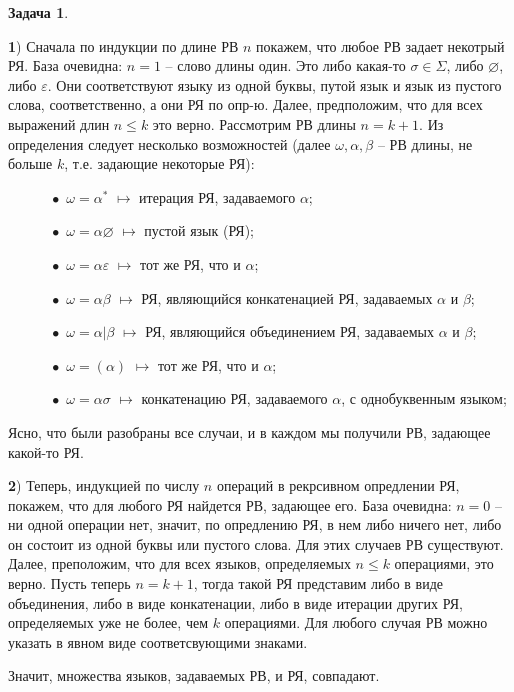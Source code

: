 \documentclass[12pt]{article}
\theoremstyle{definition}
\newtheorem{task}{Задача}
\begin{document}
\begin{task}
\textit{}

\textbf{1}) Сначала по индукции по длине РВ $n$ покажем, что любое РВ задает некотрый РЯ. База очевидна: $n = 1$ -- слово длины один. Это либо какая-то $\sigma \in \Sigma$, либо $\varnothing$, либо $\varepsilon$. Они соответствуют языку из одной буквы, путой язык и язык из пустого слова, соответственно, а они РЯ по опр-ю. Далее, предположим, что для всех выражений длин $n \leqslant k$ это верно. Рассмотрим РВ длины $n=k+1$. Из определения следует несколько возможностей (далее $\omega, \alpha, \beta$ -- РВ длины, не больше $k$, т.е. задающие некоторые РЯ): 

$\quad\quad\quad\bullet$ $\omega = \alpha^*$ $\mapsto$ итерация РЯ, задаваемого $\alpha$;


$\quad\quad\quad\bullet$ $\omega = \alpha\varnothing$ $\mapsto$ пустой язык (РЯ);

$\quad\quad\quad\bullet$ $\omega = \alpha\varepsilon$ $\mapsto$ тот же РЯ, что и $\alpha$;

$\quad\quad\quad\bullet$ $\omega = \alpha\beta$ $\mapsto$ РЯ, являющийся конкатенацией РЯ, задаваемых $\alpha$ и $\beta$;

$\quad\quad\quad\bullet$ $\omega = \alpha|\beta$ $\mapsto$ РЯ, являющийся объединением РЯ, задаваемых $\alpha$ и $\beta$;

$\quad\quad\quad\bullet$ $\omega = (\alpha)$ $\mapsto$ тот же РЯ, что и $\alpha$;

$\quad\quad\quad\bullet$ $\omega = \alpha\sigma$ $\mapsto$ конкатенацию РЯ, задаваемого $\alpha$, с однобуквенным языком;

Ясно, что были разобраны все случаи, и в каждом мы получили РВ, задающее какой-то РЯ.

\textbf{2}) Теперь, индукцией по числу $n$ операций в рекрсивном опредлении РЯ, покажем, что для любого РЯ найдется РВ, задающее его. База очевидна: $n = 0$ -- ни одной операции нет, значит, по опредлению РЯ, в нем либо ничего нет, либо он состоит из одной буквы или пустого слова. Для этих случаев РВ существуют. Далее, преположим, что для всех языков, определяемых $n \leqslant k$ операциями, это верно. Пусть теперь $n=k+1$, тогда такой РЯ представим либо в виде объединения, либо в виде конкатенации, либо в виде итерации других РЯ, определяемых уже не более, чем $k$ операциями. Для любого случая РВ можно указать в явном виде соответсвующими знаками.

Значит, множества языков, задаваемых РВ, и РЯ, совпадают.

\end{task}
\end{document}
